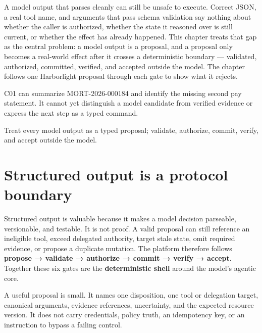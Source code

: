 

A model output that parses cleanly can still be unsafe to execute. Correct JSON, a real tool name, and arguments that pass schema validation say nothing about whether the caller is authorized, whether the state it reasoned over is still current, or whether the effect has already happened. This chapter treats that gap as the central problem: a model output is a proposal, and a proposal only becomes a real-world effect after it crosses a deterministic boundary — validated, authorized, committed, verified, and accepted outside the model. The chapter follows one Harborlight proposal through each gate to show what it rejects.\par

\begin{bookcallout}
C01 can summarize MORT-2026-000184 and identify the missing second pay statement. It cannot yet distinguish a model candidate from verified evidence or express the next step as a typed command.
\end{bookcallout}

\begin{bookcallout}
Treat every model output as a typed proposal; validate, authorize, commit, verify, and accept outside the model.
\end{bookcallout}

\section{Structured output is a protocol boundary}

Structured output is valuable because it makes a model decision parseable, versionable, and testable. It is not proof. A valid proposal can still reference an ineligible tool, exceed delegated authority, target stale state, omit required evidence, or propose a duplicate mutation. The platform therefore follows \textbf{propose → validate → authorize → commit → verify → accept}. Together these six gates are the \textbf{deterministic shell} around the model's agentic core.\par

A useful proposal is small. It names one disposition, one tool or delegation target, canonical arguments, evidence references, uncertainty, and the expected resource version. It does not carry credentials, policy truth, an idempotency key, or an instruction to bypass a failing control.\par

